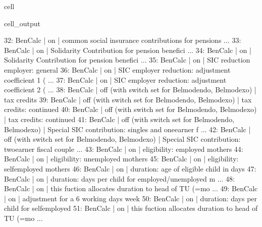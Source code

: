 \documentclass[letterpaper,10pt,english]{sphinxmanual}
\begin{document}
\begin{sphinxuseclass}{cell}
\begin{sphinxuseclass}{cell_output}
\begin{sphinxVerbatim}[commandchars=\\\{\}]
32: BenCalc      | on                                                       |    common social insurance contributions for pensions ... 
33: BenCalc      | on                                                       |    \PYGZdq{} \PYGZdq{}\PYGZdq{}Solidarity Contribution\PYGZdq{}\PYGZdq{} for pension benefici ... 
34: BenCalc      | on                                                       |    \PYGZdq{} \PYGZdq{}\PYGZdq{}Solidarity Contribution\PYGZdq{}\PYGZdq{} for pension benefici ... 
35: BenCalc      | on                                                       |    SIC reduction employer: general 
36: BenCalc      | on                                                       |    SIC employer reduction: adjustment coefficient 1 ( ... 
37: BenCalc      | on                                                       |    SIC employer reduction: adjustment coefficient 2 ( ... 
38: BenCalc      | off (with switch set for Belmod\PYGZus{}endo, Belmod\PYGZus{}exo)        |    tax credits 
39: BenCalc      | off (with switch set for Belmod\PYGZus{}endo, Belmod\PYGZus{}exo)        |    tax credits: continued 
40: BenCalc      | off (with switch set for Belmod\PYGZus{}endo, Belmod\PYGZus{}exo)        |    tax credits: continued 
41: BenCalc      | off (with switch set for Belmod\PYGZus{}endo, Belmod\PYGZus{}exo)        |    Special SIC contribution: singles and one\PYGZhy{}earner f ... 
42: BenCalc      | off (with switch set for Belmod\PYGZus{}endo, Belmod\PYGZus{}exo)        |    Special SIC contribution: two\PYGZhy{}earner fiscal couple ... 
43: BenCalc      | on                                                       |    eligibility: employed mothers 
44: BenCalc      | on                                                       |    eligibility: unemployed mothers 
45: BenCalc      | on                                                       |    eligibility: self\PYGZhy{}employed mothers 
46: BenCalc      | on                                                       |    duration: age of eligible child in days 
47: BenCalc      | on                                                       |    duration: days per child for employed/unemployed m ... 
48: BenCalc      | on                                                       |    this fuction allocates duration to head of TU (=mo ... 
49: BenCalc      | on                                                       |    adjustment for a 6 working days week 
50: BenCalc      | on                                                       |    duration: days per child for self\PYGZhy{}employed 
51: BenCalc      | on                                                       |    this fuction allocates duration to head of TU (=mo ... 

\end{sphinxVerbatim}
\end{sphinxuseclass}
\end{sphinxuseclass}
\end{document}
